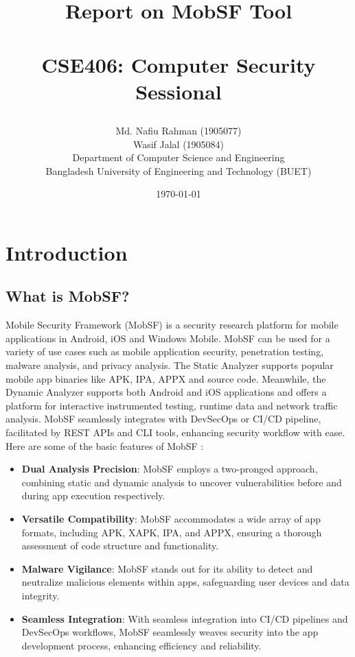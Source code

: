 \documentclass{report}
\title{
	\endgraf\bigskip
	
	\begin{center}
		\Huge {{Report on MobSF Tool} }\\\\
		\vspace{0.5cm}
		\large {CSE406: Computer Security Sessional}
	\end{center}
	\bigskip
	\bigskip
}
\author{
    \large{Md. Nafiu Rahman (1905077)}\\
	\large{Wasif Jalal (1905084)}\\
	\large{Department of Computer Science and Engineering}\\
    \large{Bangladesh University of Engineering and Technology (BUET)}
}
\date{
	\endgraf\bigskip
	\Large{\today}
}
\begin{document}
\maketitle
\tableofcontents


\chapter{Introduction}

\section{What is MobSF?}
Mobile Security Framework (MobSF) is a security research platform for mobile applications in Android, iOS and Windows Mobile. MobSF can be used for a variety of use cases such as mobile application security, penetration testing, malware analysis, and privacy analysis. The Static Analyzer supports popular mobile app binaries like APK, IPA, APPX and source code. Meanwhile, the Dynamic Analyzer supports both Android and iOS applications and offers a platform for interactive instrumented testing, runtime data and network traffic analysis. MobSF seamlessly integrates with DevSecOps or CI/CD pipeline, facilitated by REST APIs and CLI tools, enhancing security workflow with ease. Here are some of the basic features of MobSF :

\begin{itemize}
    \item \textbf{Dual Analysis Precision}: MobSF employs a two-pronged approach, combining static and dynamic analysis to uncover vulnerabilities before and during app execution respectively.
    
    \item \textbf{Versatile Compatibility}: MobSF accommodates a wide array of app formats, including APK, XAPK, IPA, and APPX, ensuring a thorough assessment of code structure and functionality.
    
    \item \textbf{Malware Vigilance}: MobSF stands out for its ability to detect and neutralize malicious elements within apps, safeguarding user devices and data integrity.
    
    \item \textbf{Seamless Integration}: With seamless integration into CI/CD pipelines and DevSecOps workflows, MobSF seamlessly weaves security into the app development process, enhancing efficiency and reliability.
    
\end{itemize}
\end{document}
